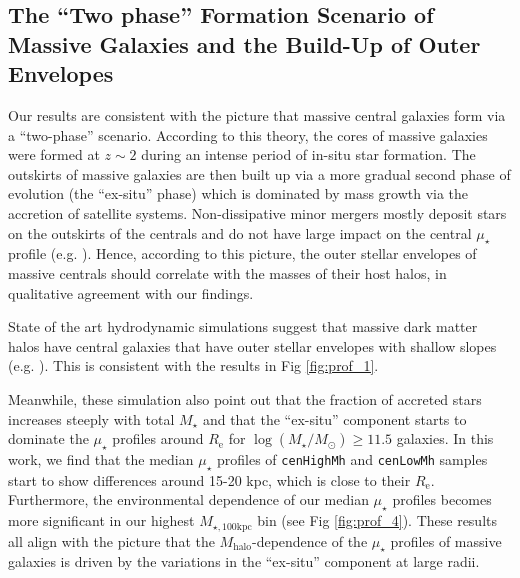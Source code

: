 \documentclass[a4paper,fleqn,usenatbib]{mnras}
\def\rbcg{\texttt{cenHighMh}}
\def\nbcg{\texttt{cenLowMh}}
\def\mstar{{$M_{\star}$}}
\def\mhalo{{$M_{\mathrm{halo}}$}}
\def\logms{{$\log (M_{\star}/M_{\odot})$}}
\def\mtot{{$M_{\star,100\mathrm{kpc}}$}}
\def\mden{{$\mu_{\star}$}}
\begin{document}
    
\subsection{The ``Two phase'' Formation Scenario of Massive Galaxies and the 
            Build-Up of Outer Envelopes}
            
    Our results are consistent with the picture that massive central galaxies form via 
    a ``two-phase'' scenario. 
    According to this theory, the cores of massive galaxies were formed at $z{\sim} 2$ 
    during an intense period of in-situ star formation. 
    The outskirts of massive galaxies are then built up via a more gradual second 
    phase of evolution (the ``ex-situ'' phase) which is dominated by mass growth via 
    the accretion of satellite systems. 
    Non-dissipative minor mergers mostly deposit stars on the outskirts of the 
    centrals and do not have large impact on the central \mden{} profile 
    (e.g. \citealt{Oogi2013, Bedorf2013}). 
    Hence, according to this picture, the outer stellar envelopes of massive centrals 
    should correlate with the masses of their host halos, in qualitative agreement with
    our findings. 
          
    State of the art hydrodynamic simulations suggest that massive dark matter halos 
    have central galaxies that have outer stellar envelopes with shallow slopes 
    (e.g. \citealt{Pillepich2014}). 
    This is consistent with the results in Fig \ref{fig:prof_1}.
     
    Meanwhile, these simulation also point out that the fraction of accreted stars 
    increases steeply with total \mstar{} and that the ``ex-situ'' component
    starts to dominate the \mden{} profiles around $R_{\mathrm{e}}$ for 
    \logms{}$\geq 11.5$ galaxies. 
    In this work, we find that the median \mden{} profiles of \rbcg{} and \nbcg{} 
    samples start to show differences around 15-20 kpc, which is close to 
    their $R_{\mathrm{e}}$. 
    Furthermore, the environmental dependence of our median \mden{} profiles 
    becomes more significant in our highest \mtot{} bin (see Fig \ref{fig:prof_4}). 
    These results all align with the picture that the \mhalo{}-dependence of the 
    \mden{} profiles of massive galaxies is driven by the variations in the 
    ``ex-situ'' component at large radii. 
   
\end{document}
